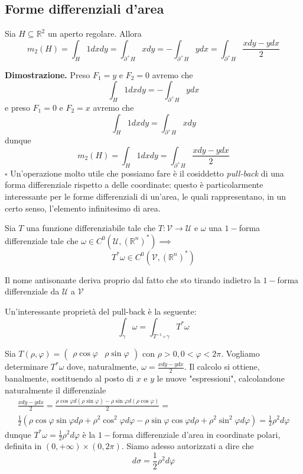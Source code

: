 \subsection{Forme differenziali d'area}
%
\begin{prop}
	Sia $H \subseteq \mathbb{R}^2$ un aperto regolare. Allora
	$$
	m_2(H) = \int_H 1dxdy = \int_{\partial^{+} H} xdy = - \int_{\partial^{+} H} ydx = \int_{\partial^{+} H}	 \frac{xdy - ydx}{2}
	$$
\end{prop}
%
\noindent \textbf{Dimostrazione. }
Preso $F_1=y$ e $F_2 = 0$ avremo che
$$
\int_H 1dxdy = -\int_{\partial^{+} H} ydx
$$
e preso $F_1 = 0$ e $F_2 = x$ avremo che
$$
\int_H 1dxdy = \int_{\partial^{+} H} xdy
$$
dunque
$$
m_2(H) = \int_H 1dxdy = \int_{\partial^{+} H} \frac{xdy - ydx}{2} 
$$
\hfill $\square$
%
Un'operazione molto utile che possiamo fare è il cosiddetto \emph{pull-back} di una forma differenziale rispetto a delle coordinate: questo è particolarmente interessante per le forme differenziali di un'area, le quali rappresentano, in un certo senso, l'elemento infinitesimo di area.
%
\vspace{0.5cm}
\begin{definition}[\textcolor{blue}{pull-back di una $1-$forma differenziale}]
	Sia $T$ una funzione differenziabile tale che $T: \mathcal{V} \to \mathcal{U}$ e $\omega$ una $1-$forma differenziale tale che $\omega \in C^0(\mathcal{U}, (\mathbb{R}^n)^*) \implies$
	$$
	T^*\omega \in C^0(\mathcal{V}, (\mathbb{R}^n)^*)
	$$
\end{definition}
%
\begin{remark}
	Il nome antisonante deriva proprio dal fatto che sto tirando indietro la $1-$forma differenziale da $\mathcal{U}$ a $\mathcal{V}$
\end{remark}
%
Un'interessante proprietà del pull-back è la seguente:
$$
\int_\gamma \omega = \int_{T^{-1} \circ \gamma} T^*\omega
$$
%
\vspace{0.5cm}
\begin{example}[\textcolor{blue}{forma d'area in coordinate polari}]
	Sia $T(\rho, \varphi) = \begin{pmatrix}	\rho \cos{\varphi} & \rho \sin{\varphi} \end{pmatrix}$ con $\rho > 0, 0 < \varphi < 2\pi$. Vogliamo determinare $T^*\omega$ dove, naturalmente, $\omega = \frac{xdy-ydx}{2}$. Il calcolo si ottiene, banalmente, sostituendo al posto di $x$ e $y$ le nuove "espressioni", calcolandone
	naturalmente il differenziale
	\[\begin{aligned}
	&\frac{xdy - ydx}{2} = \frac{\rho \cos{\varphi} d(\rho \sin{\varphi}) - \rho \sin{\varphi} d(\rho \cos{\varphi})}{2} = & \\ 
	&\frac{1}{2} \left( \rho \cos{\varphi} \sin{\varphi} d\rho + \rho^2 \cos^2{\varphi} d\varphi - \rho \sin{\varphi} \cos{\varphi} d\rho + \rho^2 \sin^2{\varphi} d\varphi \right) = \frac{1}{2} \rho^2 d\varphi
	\end{aligned}\]
	dunque $T^*\omega = \frac{1}{2} \rho^2 d\varphi$ è la $1-$forma differenziale d'area in coordinate polari, definita in $(0, +\infty) \times (0, 2\pi)$. Siamo adesso autorizzati a dire che
	$$
	d\sigma = \frac{1}{2} \rho^2 d\varphi
	$$
\end{example}
